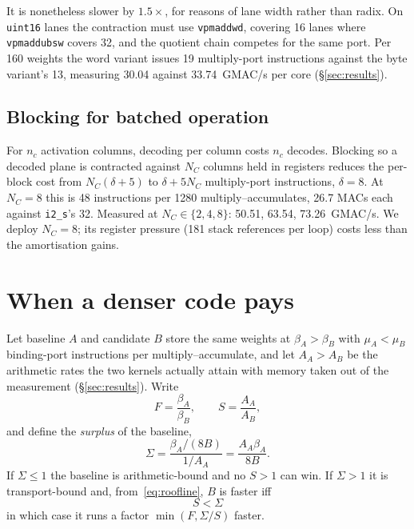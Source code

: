 \documentclass[11pt,a4paper]{article}
\newcommand{\code}[1]{\texttt{#1}}
\begin{document}
It is nonetheless slower by $1.5\times$, for reasons of lane width rather than
radix. On \code{uint16} lanes the contraction must use \code{vpmaddwd}, covering
16 lanes where \code{vpmaddubsw} covers 32, and the quotient chain competes for
the same port. Per 160 weights the word variant issues 19 multiply-port
instructions against the byte variant's 13, measuring \num{30.04} against
\num{33.74}~GMAC/s per core (\S\ref{sec:results}).

\subsection{Blocking for batched operation}
For $n_{c}$ activation columns, decoding per column costs $n_{c}$ decodes.
Blocking so a decoded plane is contracted against $N_{C}$ columns held in
registers reduces the per-block cost from $N_{C}(\delta+5)$ to $\delta+5N_{C}$
multiply-port instructions, $\delta=8$. At $N_{C}=8$ this is 48 instructions per
\num{1280} multiply--accumulates, \num{26.7} MACs each against \code{i2\_s}'s
\num{32}. Measured at $N_{C}\in\{2,4,8\}$: \num{50.51}, \num{63.54},
\num{73.26}~GMAC/s. We deploy $N_{C}=8$; its register pressure (181 stack
references per loop) costs less than the amortisation gains.

\section{When a denser code pays}\label{sec:condition}

Let baseline $A$ and candidate $B$ store the same weights at
$\beta_{A}>\beta_{B}$ with $\mu_{A}<\mu_{B}$ binding-port instructions per
multiply--accumulate, and let $A_{A}>A_{B}$ be the arithmetic rates the two
kernels actually attain with memory taken out of the measurement
(\S\ref{sec:results}). Write
\begin{equation}
F=\frac{\beta_{A}}{\beta_{B}},\qquad S=\frac{A_{A}}{A_{B}},
\end{equation}
and define the \emph{surplus} of the baseline,
\begin{equation}
\Sigma=\frac{\beta_{A}/(8B)}{1/A_{A}}=\frac{A_{A}\beta_{A}}{8B} .
\label{eq:surplus}
\end{equation}
If $\Sigma\le 1$ the baseline is arithmetic-bound and no $S>1$ can win. If
$\Sigma>1$ it is transport-bound and, from~\eqref{eq:roofline}, $B$ is faster iff
\begin{equation}
\boxed{\;S<\Sigma\;}
\label{eq:condition}
\end{equation}
in which case it runs a factor $\min(F,\Sigma/S)$ faster.
\end{document}

